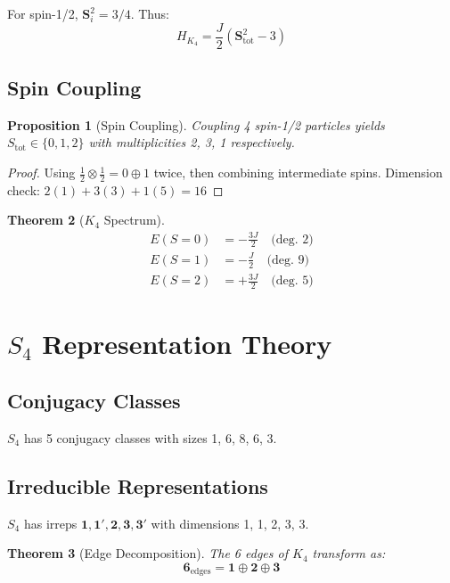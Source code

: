 \documentclass[11pt,a4paper]{article}
\newtheorem{theorem}{Theorem}[section]
\newtheorem{proposition}[theorem]{Proposition}
\theoremstyle{definition}
\begin{document}
For spin-1/2, $\mathbf{S}_i^2 = 3/4$. Thus:
\begin{equation}
H_{K_4} = \frac{J}{2}\left( \mathbf{S}_{\text{tot}}^2 - 3 \right)
\end{equation}

\subsection{Spin Coupling}

\begin{proposition}[Spin Coupling]
Coupling 4 spin-1/2 particles yields $S_{\text{tot}} \in \{0, 1, 2\}$ with multiplicities 2, 3, 1 respectively.
\end{proposition}

\begin{proof}
Using $\frac{1}{2} \otimes \frac{1}{2} = 0 \oplus 1$ twice, then combining intermediate spins. Dimension check: $2(1) + 3(3) + 1(5) = 16$ \checkmark
\end{proof}

\begin{theorem}[$K_4$ Spectrum]
\begin{align}
E(S=0) &= -\frac{3J}{2} \quad \text{(deg. 2)} \\
E(S=1) &= -\frac{J}{2} \quad \text{(deg. 9)} \\
E(S=2) &= +\frac{3J}{2} \quad \text{(deg. 5)}
\end{align}
\end{theorem}

\section{$S_4$ Representation Theory}

\subsection{Conjugacy Classes}

$S_4$ has 5 conjugacy classes with sizes 1, 6, 8, 6, 3.

\subsection{Irreducible Representations}

$S_4$ has irreps $\mathbf{1}, \mathbf{1}', \mathbf{2}, \mathbf{3}, \mathbf{3}'$ with dimensions 1, 1, 2, 3, 3.

\begin{theorem}[Edge Decomposition]
The 6 edges of $K_4$ transform as:
\begin{equation}
\mathbf{6}_{\text{edges}} = \mathbf{1} \oplus \mathbf{2} \oplus \mathbf{3}
\end{equation}
\end{theorem}
\end{document}
